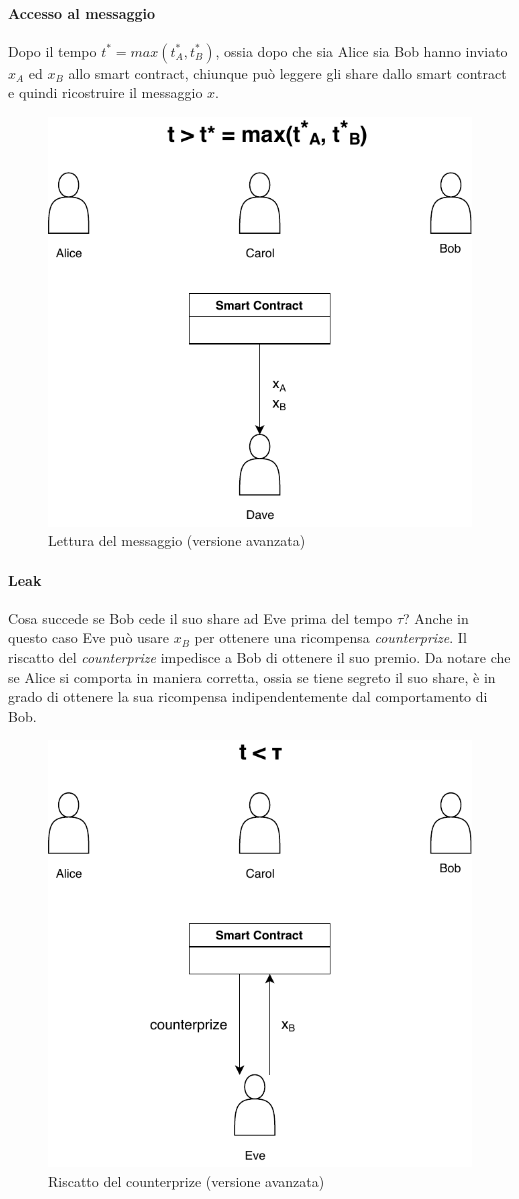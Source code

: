 \paragraph{Accesso al messaggio}
Dopo il tempo $ t^* = max(t^*_A, t^*_B) $, ossia dopo che sia Alice sia Bob
hanno inviato $ x_A $ ed $ x_B $
allo smart contract, chiunque può leggere gli share dallo smart contract e quindi
ricostruire il messaggio $ x $.
\begin{figure}[H]
	\centering
	\includegraphics[width=0.5\linewidth]{images/chap_protocollo/avanzato-leggi.pdf}
	\caption{Lettura del messaggio (versione avanzata)}
\end{figure}

\paragraph{Leak}
Cosa succede se Bob cede il suo share ad Eve prima del tempo $ \tau $?
Anche in questo caso Eve può usare $ x_B $ per ottenere una ricompensa
\textit{counterprize}.
Il riscatto del \textit{counterprize} impedisce a Bob di ottenere il suo premio.
Da notare che se Alice si comporta in maniera corretta, ossia se tiene segreto il
suo share, è in grado di ottenere la sua ricompensa indipendentemente dal comportamento
di Bob.
\begin{figure}[H]
	\centering
	\includegraphics[width=0.4\linewidth]{images/chap_protocollo/avanzato-leak-1.pdf}
	\caption{Riscatto del counterprize (versione avanzata)}
\end{figure}

